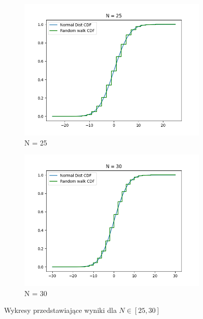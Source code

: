 \documentclass{report}
\begin{document}
\begin{figure}[H]
    \centering
    \begin{subfigure}{.5\textwidth}
      \centering
      \includegraphics[width=1.1\linewidth]{plotN25.png}
      \caption{N = 25}
      \label{fig:plotbnfunc1}
    \end{subfigure}%
    \begin{subfigure}{.5\textwidth}
      \centering
      \includegraphics[width=1.1\linewidth]{plotN30.png}
      \caption{N = 30}
      \label{fig:plotbnfunc2}
    \end{subfigure}
    \caption{Wykresy przedstawiające wyniki dla \(N\in[25,30] \)}
    \label{fig:bn}
\end{figure}
\end{document}
